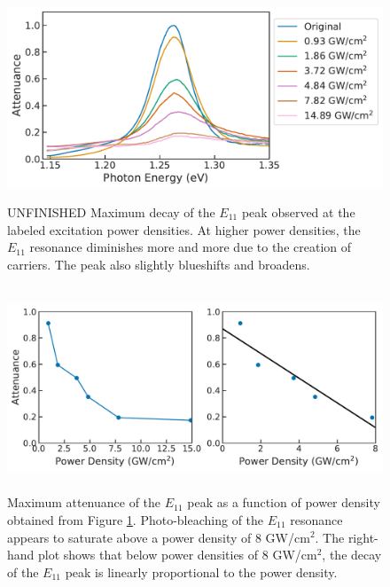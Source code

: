 \begin{figure}[ht]
	\centering
	\includegraphics[height=2.4in]{images/chapter_my_data/Weilu_CNT_abs_max_change}
	\caption{{\color{red}UNFINISHED} Maximum decay of the $E_{11}$ peak observed at the labeled excitation power densities. At higher power densities, the $E_{11}$ resonance diminishes more and more due to the creation of carriers. The peak also slightly blueshifts and broadens.}
	\label{fig:weilu_cnt_max_decay}
\end{figure}

\begin{figure}[ht]
	\centering
	\includegraphics[height=2.4in]{images/chapter_my_data/Weilu_CNT_max_attenuance_and_fit}
	\caption{Maximum attenuance of the $E_{11}$ peak as a function of power density obtained from Figure \ref{fig:weilu_cnt_max_decay}. Photo-bleaching of the $E_{11}$ resonance appears to saturate above a power density of 8 GW/cm$^2$. The right-hand plot shows that below power densities of 8 GW/cm$^2$, the decay of the $E_{11}$ peak is linearly proportional to the power density.}
\end{figure}

